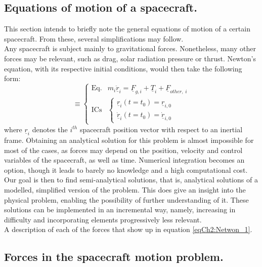	\subsection{Equations of motion of a spacecraft.}
	\indent This section intends to briefly note the general equations of motion of a certain spacecraft. From these, several simplifications may follow. \\
	\indent Any spacecraft is subject mainly to gravitational forces. Nonetheless, many other forces may be relevant, such as drag, solar radiation pressure or thrust. Newton's equation, with its respective initial conditions, would then take the following form:
	\begin{equation}
	[P]\equiv\left\{ \begin{array}{lcc}
	\text{Eq.} & m_i \ddot{\underline{r}}_i = \underline{F}_{g, i} + \underline{T}_i + \underline{F}_{other,\; i}\\[1em]
	\text{ICs} & \left\{ \begin{array}{ll}
	\underline{r}_{i} (t = t_0) = \underline{r}_{i, 0} \\
	\dot{\underline{r}}_{i} (t = t_0) = \dot{\underline{r}}_{i, 0} 
	\end{array}\right.
	\end{array}\right.
	\label{eqCh2:Netwon_1}
	\end{equation}
	\noindent where $\underline{r}_i$ denotes the $i^{th}$ spacecraft position vector with respect to an inertial frame. Obtaining an analytical solution for this problem is almost impossible for most of the cases, as forces may depend on the position, velocity and control variables of the spacecraft, as well as time. Numerical integration becomes an option, though it leads to barely no knowledge and a high computational cost. Our goal is then to find semi-analytical solutions, that is, analytical solutions of a modelled, simplified version of the problem. This does give an insight into the physical problem, enabling the possibility of further understanding of it. These solutions can be implemented in an incremental way, namely, increasing in difficulty and incorporating elements progressively less relevant. \\
	\indent A description of each of the forces that show up in equation \eqref{eqCh2:Netwon_1}.
		\subsection{Forces in the spacecraft motion problem.}

